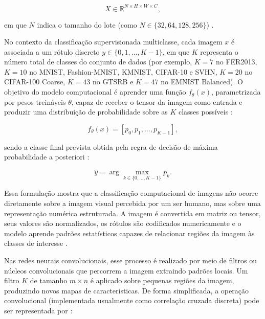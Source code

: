 \documentclass[
    12pt,
    openright,
    oneside,
    a4paper,
    english,
    brazil
]{abntex2}
\begin{document}
\begin{equation}
\label{eq:lote_tensor}
X \in \mathbb{R}^{N \times H \times W \times C},
\end{equation}

em que \(N\) indica o tamanho do lote (como \(N \in \{32, 64, 128, 256\}\)) \cite{goodfellow2016deep}.

No contexto da classificação supervisionada multiclasse, cada imagem \(x\) é associada a um rótulo discreto \(y \in \{0, 1, \dots, K-1\}\), em que \(K\) representa o número total de classes do conjunto de dados (por exemplo, \(K=7\) no FER2013, \(K=10\) no MNIST, Fashion-MNIST, KMNIST, CIFAR-10 e SVHN, \(K=20\) no CIFAR-100 Coarse, \(K=43\) no GTSRB e \(K=47\) no EMNIST Balanced). O objetivo do modelo computacional é aprender uma função \(f_{\theta}(x)\), parametrizada por pesos treináveis \(\theta\), capaz de receber o tensor da imagem como entrada e produzir uma distribuição de probabilidade sobre as \(K\) classes possíveis \cite{goodfellow2016deep,deisenroth2020mathematics}:

\begin{equation}
\label{eq:saida_probabilidades}
f_{\theta}(x) = [p_0, p_1, \dots, p_{K-1}],
\end{equation}

sendo a classe final prevista obtida pela regra de decisão de máxima probabilidade a posteriori \cite{deisenroth2020mathematics,goodfellow2016deep}:

\begin{equation}
\label{eq:regra_argmax}
\hat{y} = \arg\max_{k \in \{0, \dots, K-1\}} p_k.
\end{equation}

Essa formulação mostra que a classificação computacional de imagens não ocorre diretamente sobre a imagem visual percebida por um ser humano, mas sobre uma representação numérica estruturada. A imagem é convertida em matriz ou tensor, seus valores são normalizados, os rótulos são codificados numericamente e o modelo aprende padrões estatísticos capazes de relacionar regiões da imagem às classes de interesse \cite{gonzalez2008digital,goodfellow2016deep}.

Nas redes neurais convolucionais, esse processo é realizado por meio de filtros ou núcleos convolucionais que percorrem a imagem extraindo padrões locais. Um filtro \(K\) de tamanho \(m \times n\) é aplicado sobre pequenas regiões da imagem, produzindo novos mapas de características. De forma simplificada, a operação convolucional (implementada usualmente como correlação cruzada discreta) pode ser representada por \cite{goodfellow2016deep,gonzalez2008digital}:
\end{document}
